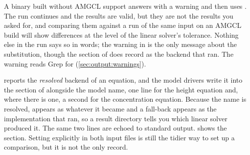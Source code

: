 \begin{warn}
  A binary built without AMGCL support answers  with a
  warning and then uses . The run continues and the results are
  valid, but they are not the results you asked for, and comparing them
  against a run of the same input on an AMGCL build will show differences at
  the level of the linear solver's tolerance. Nothing else in the run says so
  in words; the warning in  is the only message about the
  substitution, though the  section of 
  does record  as the backend that ran. The warning reads
   Grep for 
  (\cref{sec:output:warnings}).
\end{warn}

\begin{note}
   reports the \emph{resolved}
  backend of an equation, and the model drivers write it into the
   section of 
  alongside the model name, one line for the height equation and, where there
  is one, a second for the concentration equation. Because the name is
  resolved,  appears as whatever it became and a fall-back appears
  as the implementation that ran, so a result directory tells you which
  linear solver produced it. The same two lines are echoed to standard output.
   shows the section. Setting 
  explicitly in both input files is still the tidier way to set up a
  comparison, but it is not the only record.
\end{note}

\section{}
\label{sec:ref-numerics:mms}

